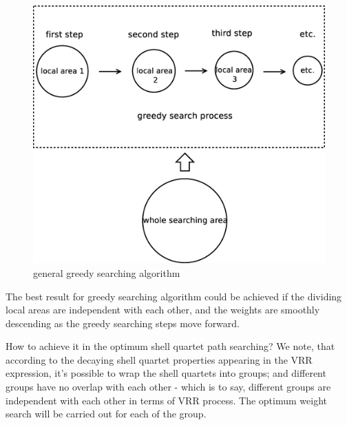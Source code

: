  \begin{figure}[htb]
 \centering
 \includegraphics[scale=0.4]{./greedy.eps}
 \caption{general greedy searching algorithm}
 \label{fig:3}
\end{figure}

The best result for greedy searching algorithm could be achieved 
if the dividing local areas are independent with each other, and the
weights are smoothly descending as the greedy searching steps move
forward.

How to achieve it in the optimum shell quartet path searching?
We note, that according to the decaying shell quartet properties 
appearing in the VRR expression, it's possible to wrap the shell
quartets into groups; and different groups have no overlap with
each other - which is to say, different groups are independent with 
each other in terms of VRR process. The optimum weight search will
be carried out for each of the group.

